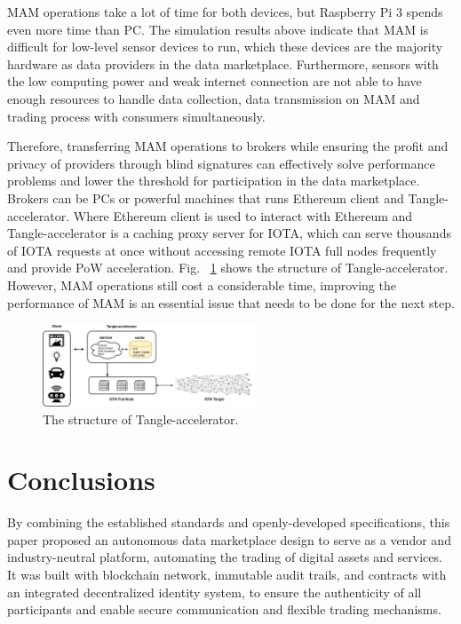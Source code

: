 \documentclass[conference]{IEEEtran}
\begin{document}
MAM operations take a lot of time for both devices, but Raspberry Pi 3 spends even more time than PC. The simulation results above indicate that MAM is difficult for low-level sensor devices to run, which these devices are the majority hardware as data providers in the data marketplace. Furthermore, sensors with the low computing power and weak internet connection are not able to have enough resources to handle data collection, data transmission on MAM and trading process with consumers simultaneously. 

Therefore, transferring MAM operations to brokers while ensuring the profit and privacy of providers through blind signatures can effectively solve performance problems and lower the threshold for participation in the data marketplace. Brokers can be PCs or powerful machines that runs Ethereum client and Tangle-accelerator\cite{TA}. Where Ethereum client is used to interact with Ethereum and Tangle-accelerator is a caching proxy server for IOTA, which can serve thousands of IOTA requests at once without accessing remote IOTA full nodes frequently and provide PoW acceleration. Fig.~ \ref{fig:ta_struct} shows the structure of Tangle-accelerator. However, MAM operations still cost a considerable time, improving the performance of MAM is an essential issue that needs to be done for the next step.  

\begin{figure}[!t]
    \centering
    \includegraphics[width=2.5in]{ta_structure}
    \caption{The structure of Tangle-accelerator.}
    \label{fig:ta_struct}
\end{figure}

\section{Conclusions}
By combining the established standards and openly-developed specifications, this paper proposed an autonomous data marketplace design to serve as a vendor and industry-neutral platform, automating the trading of digital assets and services. It was built with blockchain network, immutable audit trails, and contracts with an integrated decentralized identity system, to ensure the authenticity of all participants and enable secure communication and flexible trading mechanisms.
\end{document}
